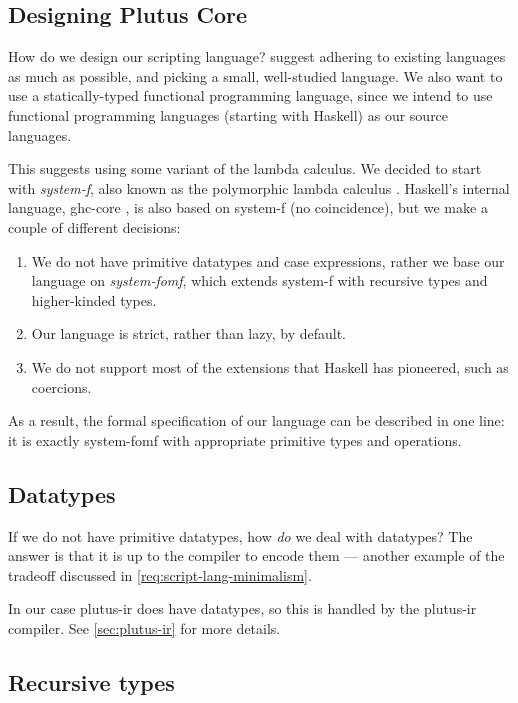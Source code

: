 \subsection{Designing Plutus Core}

How do we design our scripting language?
 suggest adhering to existing languages as much as possible, and picking a small, well-studied language.
We also want to use a statically-typed functional programming language, since we intend to use functional programming languages (starting with Haskell) as our source languages.

This suggests using some variant of the lambda calculus.
We decided to start with \emph{\gls{system-f}}, also known as the polymorphic lambda calculus \autocite{Girard-thesis}.
Haskell's internal language, \gls{ghc-core} \parencite{jones1998transformation}, is also based on \gls{system-f} (no coincidence), but we make a couple of different decisions:
\begin{enumerate}
  \item We do not have primitive datatypes and case expressions, rather we base our language on \emph{\gls{system-fomf}}, which extends \gls{system-f} with recursive types and higher-kinded types.
  \item Our language is strict, rather than lazy, by default.
  \item We do not support most of the extensions that Haskell has pioneered, such as coercions.
\end{enumerate}

As a result, the formal specification of our language can be described in one line: it is exactly \gls{system-fomf} with appropriate primitive types and operations.


\subsection{Datatypes}
If we do not have primitive datatypes, how \emph{do} we deal with datatypes?
The answer is that it is up to the compiler to encode them --- another example of the tradeoff discussed in \cref{req:script-lang-minimalism}.

In our case \gls{plutus-ir} does have datatypes, so this is handled by the \gls{plutus-ir} compiler. See \cref{sec:plutus-ir} for more details.

\subsection{Recursive types}

